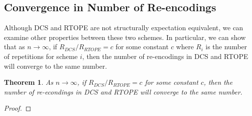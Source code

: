 \documentclass[12pt]{article}
\newtheorem{theorem}{Theorem}[section]
\begin{document}
\subsection{Convergence in Number of Re-encodings}
Although DCS and RTOPE are not structurally expectation equivalent, we can examine other properties between these two schemes. In particular, we can show that as $n \to \infty$, if $R_{DCS} / R_{RTOPE} = c$ for some constant $c$ where $R_{i}$ is the number of repetitions for scheme $i$, then the number of re-encodings in DCS and RTOPE will converge to the same number. 
\begin{theorem}
    As $n \to \infty$, if $R_{DCS} / R_{RTOPE} = c$ for some constant $c$, then the number of re-econdings in DCS and RTOPE will converge to the same number.
  \end{theorem}
  \begin{proof}
  \end{proof}
\end{document}

